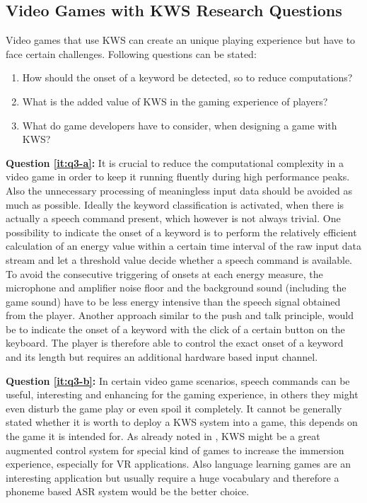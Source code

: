 \subsection{Video Games with KWS Research Questions}\label{sec:intro_rq_games}
Video games that use KWS can create an unique playing experience but have to face certain challenges.
Following questions can be stated:
\begin{enumerate}[label={Q.3.\alph*)}, leftmargin=1.75cm]
  \item How should the onset of a keyword be detected, so to reduce computations?\label{it:q3-a}
  \item What is the added value of KWS in the gaming experience of players?\label{it:q3-b}
  \item What do game developers have to consider, when designing a game with KWS?\label{it:q3-c}
\end{enumerate}
\noindent
\textbf{Question \ref{it:q3-a}:} 
It is crucial to reduce the computational complexity in a video game in order to keep it running fluently during high performance peaks.
Also the unnecessary processing of meaningless input data should be avoided as much as possible.
Ideally the keyword classification is activated, when there is actually a speech command present, which however is not always trivial.
One possibility to indicate the onset of a keyword is to perform the relatively efficient calculation of an energy value within a certain time interval of the raw input data stream and let a threshold value decide whether a speech command is available. 
To avoid the consecutive triggering of onsets at each energy measure, the microphone and amplifier noise floor and the background sound (including the game sound) have to be less energy intensive than the speech signal obtained from the player.
Another approach similar to the push and talk principle, would be to indicate the onset of a keyword with the click of a certain button on the keyboard.
The player is therefore able to control the exact onset of a keyword and its length but requires an additional hardware based input channel.

\textbf{Question \ref{it:q3-b}:}
In certain video game scenarios, speech commands can be useful, interesting and enhancing for the gaming experience, in others they might even disturb the game play or even spoil it completely.
It cannot be generally stated whether it is worth to deploy a KWS system into a game, this depends on the game it is intended for.
As already noted in , KWS might be a great augmented control system for special kind of games to increase the immersion experience, especially for VR applications.
Also language learning games are an interesting application but usually require a huge vocabulary and therefore a phoneme based ASR system would be the better choice.

